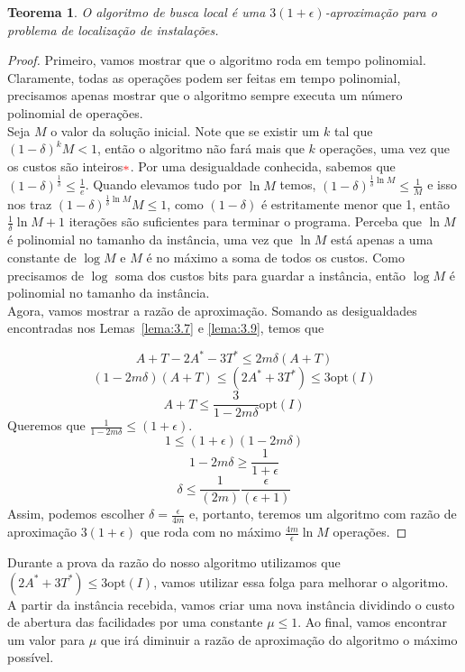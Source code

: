 \documentclass[12pt]{article}
\newcommand{\opt}{\ensuremath{\mathrm{opt}}}
\newtheorem{theorem}{Teorema}[section]
\newcommand{\red}[1]{{\color{red}{#1}}}
\begin{document}
\begin{theorem}
    O algoritmo de busca local é uma $3(1+\epsilon)$-aproximação para o problema de localização de instalações.
\end{theorem}
\begin{proof}
    Primeiro, vamos mostrar que o algoritmo roda em tempo polinomial. Claramente, todas as operações podem ser feitas em tempo polinomial, precisamos apenas mostrar que o algoritmo sempre executa um número polinomial de operações. \\
    Seja $M$ o valor da solução inicial. Note que se existir um $k$ tal que $(1-\delta)^kM < 1$, então o algoritmo não fará mais que $k$ operações, uma vez que os custos são inteiros$\red{*}$. Por uma desigualdade conhecida, sabemos que $(1 - \delta)^{\frac{1}{\delta}} \leq \frac{1}{e}$. Quando elevamos tudo por $\ln M$ temos, $(1- \delta)^{\frac{1}{\delta}\ln M} \leq \frac{1}{M}$ e isso nos traz $ (1- \delta)^{\frac{1}{\delta}\ln M}M \leq 1$, como $(1-\delta)$ é estritamente menor que 1, então $\frac{1}{\delta}\ln M + 1$ iterações são suficientes para terminar o programa. Perceba que $\ln M$ é polinomial no tamanho da instância, uma vez que $\ln M$ está apenas a uma constante de $\log M$ e $M$ é no máximo a soma de todos os custos. Como precisamos de $\log$ soma dos custos bits para guardar a instância, então $\log M$ é polinomial no tamanho da instância. \\
    Agora, vamos mostrar a razão de aproximação. Somando as desigualdades encontradas nos Lemas~\ref{lema:3.7} e \ref{lema:3.9}, temos que 
    
        \[A + T - 2A^* - 3T^* \leq 2m\delta(A+T)\] 
        \[(1 - 2m\delta)(A+T) \leq (2A^* + 3T^*) \leq 3 \opt(I)\]
        \[A+T \leq \frac{3}{1-2m\delta}\opt(I)\]
    Queremos que $\frac{1}{1-2m\delta}\leq (1+\epsilon)$.
    \[1 \leq (1+\epsilon)(1-2m\delta)\]
    \[1 - 2m\delta \geq \frac{1}{1+\epsilon}\]
    \[\delta \leq \frac{1}{(2m)} \frac{\epsilon}{(\epsilon+1)}\]
    Assim, podemos escolher $\delta = \frac{\epsilon}{4m}$ e, portanto, teremos um algoritmo com razão de aproximação $3(1+\epsilon)$ que roda com no máximo $\frac{4m}{\epsilon}\ln M$ operações.
\end{proof}
Durante a prova da razão do nosso algoritmo utilizamos que $(2A^* + 3T^*) \leq 3\opt(I)$, vamos utilizar essa folga para melhorar o algoritmo. \\
A partir da instância recebida, vamos criar uma nova instância dividindo o custo de abertura das facilidades por uma constante $\mu \leq 1$. Ao final, vamos encontrar um valor para $\mu$ que irá diminuir a razão de aproximação do algoritmo o máximo possível. \\
\end{document}
